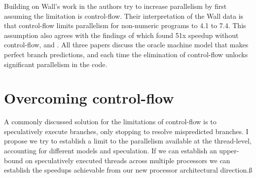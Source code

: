 \documentclass[12pt,twoside,letterpaper]{article}
\begin{document}
Building on Wall's work in \cite{Lam:1992p188} the authors try to increase parallelism by first assuming the limitation is control-flow. Their interpretation of the Wall data is that control-flow limits parallelism for non-numeric programs to 4.1 to 7.4. This assumption also agrees with the findings of \cite{Riseman:1972p215} which found 51x speedup without control-flow, and \cite{Nicolau:1984p217}. All three papers discuss the oracle machine model that makes perfect branch predictions, and each time the elimination of control-flow unlocks significant parallelism in the code.

\section*{Overcoming control-flow}
A commonly discussed solution for the limitations of control-flow is to speculatively execute branches, only stopping to resolve mispredicted branches. I propose we try to establish a limit to the parallelism available at the thread-level, accounting for different models and speculation. If we can establish an upper-bound on speculatively executed threads across multiple processors we can establish the speedups achievable from our new processor architectural direction.ß



\end{document}

